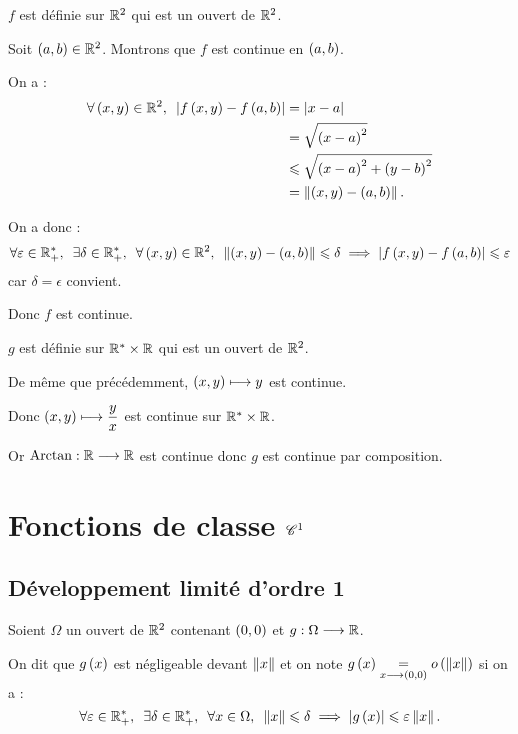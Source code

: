\begin{corr}
\(f\) est définie sur \(\mathbb{R}^2\) qui est un ouvert de \(\mathbb{R}^2\).

Soit \(\left(a,b\right)\in\mathbb{R}^2\). Montrons que \(f\) est continue en \(\left(a,b\right)\).

On a : \[\begin{aligned}
\quantifs{\forall\paren{x,y}\in\R^2}\abs{f\paren{x,y}-f\paren{a,b}}&=\abs{x-a} \\
&=\sqrt{\paren{x-a}^2} \\
&\leq\sqrt{\paren{x-a}^2+\paren{y-b}^2} \\
&=\norme{\paren{x,y}-\paren{a,b}}.
\end{aligned}\]

On a donc : \[\quantifs{\forall\epsilon\in\Rps;\exists\delta\in\Rps;\forall\paren{x,y}\in\R^2}\norme{\paren{x,y}-\paren{a,b}}\leq\delta\imp\abs{f\paren{x,y}-f\paren{a,b}}\leq\epsilon\] car \(\delta=\epsilon\) convient.

Donc \(f\) est continue.

\(g\) est définie sur \(\mathbb{R}^*\times\mathbb{R}\) qui est un ouvert de \(\mathbb{R}^2\).

De même que précédemment, \(\left(x,y\right)\longmapsto y\) est continue.

Donc \(\left(x,y\right)\longmapsto\dfrac{y}{x}\) est continue sur \(\mathbb{R}^*\times\mathbb{R}\).

Or \(\operatorname{Arctan}:\mathbb{R}\longrightarrow\mathbb{R}\) est continue donc \(g\) est continue par composition.
\end{corr}

\section{Fonctions de classe \(\mathscr{C}^{1}\)}

\subsection{Développement limité d'ordre 1}

\begin{nota}
Soient \(\Omega\) un ouvert de \(\mathbb{R}^2\) contenant \(\left(0,0\right)\) et \(g:\Omega\longrightarrow\mathbb{R}\).

On dit que \(g\left(x\right)\) est négligeable devant \(\left\|x\right\|\) et on note \(g\left(x\right)\underset{x\longrightarrow\left(0,0\right)}{=}o\left(\left\|x\right\|\right)\) si on a : \[\quantifs{\forall\epsilon\in\Rps;\exists\delta\in\Rps;\forall x\in\Omega}\norme{x}\leq\delta\imp\abs{g\paren{x}}\leq\epsilon\norme{x}.\]
\end{nota}

